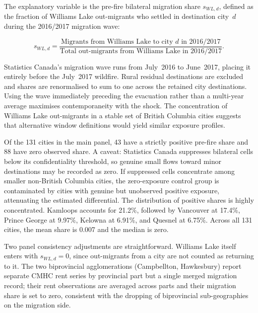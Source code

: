 \documentclass[12pt]{article}
\begin{document}
The explanatory variable is the pre-fire bilateral migration share
$s_{WL,d}$, defined as the fraction of Williams Lake out-migrants who settled
in destination city~$d$ during the 2016/2017 migration wave:

\begin{equation}
s_{WL,d} =
\frac{
\text{Migrants from Williams Lake to city } d \text{ in 2016/2017}
}{
\text{Total out-migrants from Williams Lake in 2016/2017}
}.
\label{eq:shares}
\end{equation}

Statistics Canada's migration wave runs from July~2016 to June~2017,
placing it entirely before the July~2017 wildfire. Rural residual
destinations are excluded and shares are renormalised to sum to one across
the retained city destinations. Using the wave immediately preceding the
evacuation rather than a multi-year average maximises contemporaneity with
the shock. The concentration of Williams Lake out-migrants in a stable set
of British Columbia cities suggests that alternative window definitions
would yield similar exposure profiles.

Of the 131 cities in the main panel, 43 have a strictly positive pre-fire
share and 88 have zero observed share. A caveat: Statistics Canada suppresses
bilateral cells below its confidentiality threshold, so genuine small flows
toward minor destinations may be recorded as zero. If suppressed cells
concentrate among smaller non-British Columbia cities, the zero-exposure
control group is contaminated by cities with genuine but unobserved positive
exposure, attenuating the estimated differential. The distribution of
positive shares is highly concentrated. Kamloops accounts for 21.2\%,
followed by Vancouver at 17.4\%, Prince George at 9.97\%, Kelowna at
6.91\%, and Quesnel at 6.75\%. Across all 131 cities, the mean share is
0.007 and the median is zero.

Two panel consistency adjustments are straightforward. Williams Lake itself
enters with $s_{WL,d}=0$, since out-migrants from a city are not counted as
returning to it. The two biprovincial agglomerations (Campbellton, Hawkesbury)
report separate CMHC rent series by provincial part but a single merged
migration record; their rent observations are averaged across parts and their
migration share is set to zero, consistent with the dropping of biprovincial
sub-geographies on the migration side.

\end{document}
